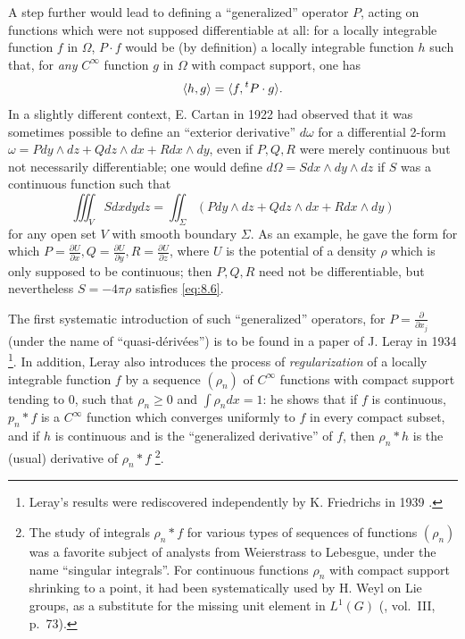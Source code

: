 \documentclass[12pt,a4paper,leqno,twoside]{extbook}
\DeclarePairedDelimiter{\ip}{\langle}{\rangle}
\newcommand{\pder}[2]{\frac{\partial #1}{\partial #2}}
\begin{document}
A step further would lead to defining a ``generalized'' operator \(P\), acting on functions which were not supposed differentiable at all: for a locally integrable function \(f\) in \(\Omega\), \(P \cdot f\) would be (by definition) a locally integrable function \(h\) such that, for \emph{any} \(C^\infty\) function \(g\) in \(\Omega\) with compact support, one has
\begin{equation}
    \label{eq:8.5}
    \ip{h,g} = \ip{f, \prescript{t}{}P \cdot g}.
\end{equation}
In a slightly different context, E. Cartan in 1922 \cite{039} had observed that it was sometimes possible to define an ``exterior derivative'' \(d\omega\) for a differential 2-form \(\omega = Pdy \wedge dz + Qdz \wedge dx + Rdx \wedge dy\), even if \(P, Q, R\) were merely continuous but not necessarily differentiable; one would define \(d\Omega = Sdx \wedge dy \wedge dz\) if \(S\) was a continuous function such that
\begin{equation}
    \label{eq:8.6}
    \iiint_V S dxdydz = \iint_\Sigma (Pdy \wedge dz + Qdz \wedge dx + Rdx \wedge dy)
\end{equation}
for any open set \(V\) with smooth boundary \(\Sigma\). As an example, he gave the form for which \(P = \pder{U}{x}, Q = \pder{U}{y}, R = \pder{U}{z}\), where \(U\) is the potential of a density \(\rho\) which is only supposed to be continuous; then \(P, Q, R\) need not be differentiable, but nevertheless \(S = -4\pi \rho\) satisfies \eqref{eq:8.6}.

The first systematic introduction of such ``generalized'' operators, for \(P = \pder{}{x_j}\) (under the name of ``quasi-dérivées'') is to be found in a paper of J. Leray in 1934 \cite{141} \footnote{Leray's results were rediscovered independently by K. Friedrichs in 1939 \cite{076}.}. In addition, Leray also introduces the process of \emph{regularization} of a locally integrable function \(f\) by a sequence \((\rho_n)\) of \(C^\infty\) functions with compact support tending to 0, such that \(\rho_n \geq 0\) and \(\int \rho_n dx = 1\): he shows that if \(f\) is continuous, \(p_n * f\) is a \(C^\infty\) function which converges uniformly to \(f\) in every compact subset, and if \(h\) is continuous and is the ``generalized derivative'' of \(f\), then \(\rho_n*h\) is the (usual) derivative of \(\rho_n*f\) \footnote{The study of integrals \(\rho_n * f\) for various types of sequences of functions \((\rho_n)\) was a favorite subject of analysts from Weierstrass to Lebesgue, under the name ``singular integrals''. For continuous functions \(\rho_n\) with compact support shrinking to a point, it had been systematically used by H. Weyl on Lie groups, as a substitute for the missing unit element in \(L^1(G)\) (\cite{227}, vol.~III, p.~73).}.
\end{document}
